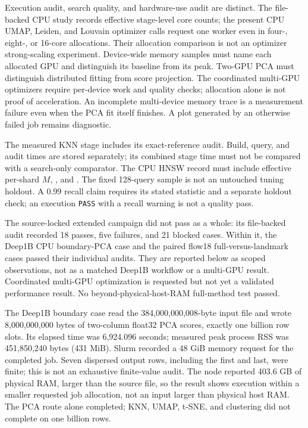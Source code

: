 \documentclass[article]{jss}
\begin{document}
Execution audit, search quality, and hardware-use audit are distinct.
The file-backed CPU study records effective stage-level core counts;
the present CPU UMAP, Leiden, and Louvain optimizer calls request one
worker even in four-, eight-, or 16-core allocations. Their allocation
comparison is not an optimizer strong-scaling experiment.
Device-wide memory samples must name
each allocated GPU and distinguish its baseline from its peak. Two-GPU
PCA must distinguish distributed fitting from score projection. The
coordinated multi-GPU optimizers require per-device work and quality
checks; allocation alone is not proof of acceleration. An incomplete
multi-device memory trace is a measurement
failure even when the PCA fit itself finishes. A plot generated by an
otherwise failed job remains diagnostic.

The measured KNN stage includes its exact-reference audit. Build, query,
and audit times are stored separately; its combined stage time must not be
compared with a search-only comparator. The CPU HNSW record must include
effective per-shard $M$, , and .
The fixed 128-query sample is not an untouched tuning holdout. A 0.99
recall claim requires its stated statistic and a separate holdout check;
an execution \texttt{PASS} with a recall warning is not a quality pass.

The source-locked extended campaign did not pass as a whole: its file-backed
audit recorded 18 passes, five failures, and 21 blocked cases. Within it,
the Deep1B CPU boundary-PCA case and the paired flow18 full-versus-landmark
cases passed their individual audits. They are reported below as scoped
observations, not as a matched Deep1B workflow or a multi-GPU result.
Coordinated multi-GPU optimization is requested but not yet a validated
performance result. No beyond-physical-host-RAM full-method test passed.

The Deep1B boundary case read the 384,000,000,008-byte input file and wrote
8,000,000,000 bytes of two-column float32 PCA scores, exactly one billion
row slots. Its elapsed time was 6,924.096 seconds; measured peak process
RSS was 451,850,240 bytes (431 MiB). Slurm recorded a 48 GiB memory
request for the completed job. Seven dispersed output rows, including the
first and last, were finite; this is not an exhaustive finite-value audit.
The node reported 403.6 GB of physical RAM, larger than the source file,
so the result shows execution within a smaller requested job allocation,
not an input larger than physical host RAM. The PCA route alone completed;
KNN, UMAP, t-SNE, and clustering did not complete on one billion rows.
\end{document}
